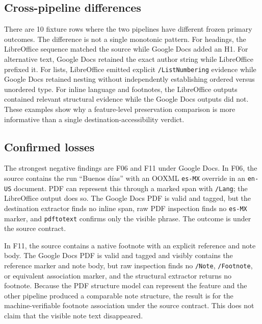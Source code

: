 \subsection{Cross-pipeline differences}

There are 10 fixture rows where the two pipelines have different frozen primary outcomes. The difference is not a single monotonic pattern. For headings, the LibreOffice sequence matched the source while Google Docs added an H1. For alternative text, Google Docs retained the exact author string while LibreOffice prefixed it. For lists, LibreOffice emitted explicit \texttt{/ListNumbering} evidence while Google Docs retained nesting without independently establishing ordered versus unordered type. For inline language and footnotes, the LibreOffice outputs contained relevant structural evidence while the Google Docs outputs did not. These examples show why a feature-level preservation comparison is more informative than a single destination-accessibility verdict.

\subsection{Confirmed losses}

The strongest negative findings are F06 and F11 under Google Docs. In F06, the source contains the run ``Buenos d\'ias'' with an OOXML \texttt{es-MX} override in an \texttt{en-US} document. PDF can represent this through a marked span with \texttt{/Lang}; the LibreOffice output does so. The Google Docs PDF is valid and tagged, but the destination extractor finds no inline span, raw PDF inspection finds no \texttt{es-MX} marker, and \texttt{pdftotext} confirms only the visible phrase. The outcome is \confirmedlost{} under the source contract.

In F11, the source contains a native footnote with an explicit reference and note body. The Google Docs PDF is valid and tagged and visibly contains the reference marker and note body, but raw inspection finds no \texttt{/Note}, \texttt{/Footnote}, or equivalent association marker, and the structural extractor returns no footnote. Because the PDF structure model can represent the feature and the other pipeline produced a comparable note structure, the result is \confirmedlost{} for the machine-verifiable footnote association under the source contract. This does not claim that the visible note text disappeared.

